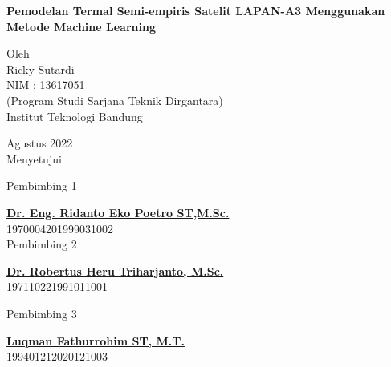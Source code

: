\newpage

\begin{center}
       \Large
        \vspace{1.5cm}
        \large
        \textbf{Pemodelan Termal Semi-empiris Satelit LAPAN-A3 Menggunakan Metode Machine Learning}\\
        
        \vfill
        
        Oleh\\
        Ricky Sutardi\\
        NIM : 13617051\\
        (Program Studi Sarjana Teknik Dirgantara)\\
        Institut Teknologi Bandung
       
       \vfill
       
       Agustus 2022\\
        \vspace{1.0cm}
       Menyetujui\\
       \begin{multicols}{2}
       
       \footnotesize Pembimbing 1 \\
       \vspace{3.5cm}
       
        \footnotesize \textbf{\underline{Dr. Eng. Ridanto Eko Poetro ST,M.Sc.}}\\
				\footnotesize 1970004201999031002 \\
        
        \footnotesize Pembimbing 2 \\
       \vspace{3.5cm}
       
       \footnotesize  \textbf{\underline{Dr. Robertus Heru Triharjanto, M.Sc.}}\\
        \footnotesize 197110221991011001 \\
        \end{multicols}

       \footnotesize Pembimbing 3 \\
       \vspace{3.5cm}
       
       \footnotesize \textbf{\underline{Luqman Fathurrohim ST, M.T.}}\\
        \footnotesize 199401212020121003 \\
       
\end{center}
